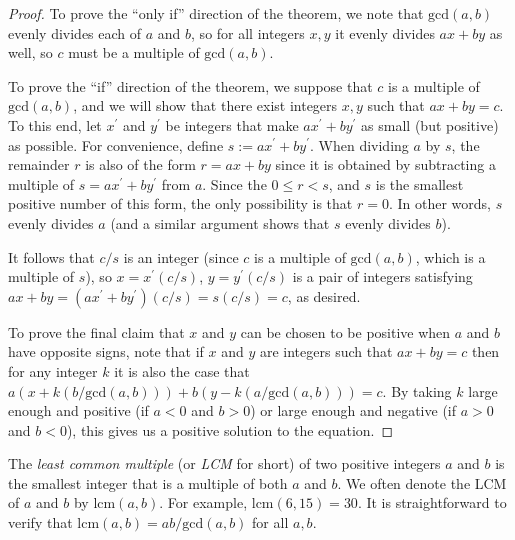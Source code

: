 \begin{proof}
	To prove the ``only if'' direction of the theorem, we note that $\mathrm{gcd}(a,b)$ evenly divides each of $a$ and $b$, so for all integers $x,y$ it evenly divides $ax + by$ as well, so $c$ must be a multiple of $\mathrm{gcd}(a,b)$.
	
	To prove the ``if'' direction of the theorem, we suppose that $c$ is a multiple of $\mathrm{gcd}(a,b)$, and we will show that there exist integers $x,y$ such that $ax+by = c$. To this end, let $x^\prime$ and $y^\prime$ be integers that make $ax^\prime + by^\prime$ as small (but positive) as possible. For convenience, define $s := ax^\prime + by^\prime$. When dividing $a$ by $s$, the remainder $r$ is also of the form $r = ax + by$ since it is obtained by subtracting a multiple of $s = ax^\prime + by^\prime$ from $a$. Since the $0 \leq r < s$, and $s$ is the smallest positive number of this form, the only possibility is that $r = 0$. In other words, $s$ evenly divides $a$ (and a similar argument shows that $s$ evenly divides $b$).
	
	It follows that $c/s$ is an integer (since $c$ is a multiple of $\mathrm{gcd}(a,b)$, which is a multiple of $s$), so $x = x^\prime(c/s)$, $y = y^\prime(c/s)$ is a pair of integers satisfying $ax + by = (ax^\prime + by^\prime)(c/s) = s(c/s) = c$, as desired.
	
	To prove the final claim that $x$ and $y$ can be chosen to be positive when $a$ and $b$ have opposite signs, note that if $x$ and $y$ are integers such that $ax + by = c$ then for any integer $k$ it is also the case that $a(x + k(b/\mathrm{gcd}(a,b))) + b(y - k(a/\mathrm{gcd}(a,b))) = c$. By taking $k$ large enough and positive (if $a < 0$ and $b > 0$) or large enough and negative (if $a > 0$ and $b < 0$), this gives us a positive solution to the equation.
\end{proof}

The \emph{least common multiple} (or \emph{LCM} for short) of two positive integers $a$ and $b$ is the smallest integer that is a multiple of both $a$ and $b$. We often denote the LCM of $a$ and $b$ by $\mathrm{lcm}(a,b)$. For example, $\mathrm{lcm}(6,15) = 30$. It is straightforward to verify that $\mathrm{lcm}(a,b) = ab/\mathrm{gcd}(a,b)$ for all $a,b$.



